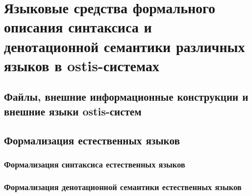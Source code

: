 \chapter{Языковые средства формального описания синтаксиса и денотационной семантики различных языков в ostis-системах}
\label{chapter_lang}


\section{Файлы, внешние информационные конструкции и внешние языки ostis-систем}
\section{Формализация естественных языков}
\subsection{Формализация синтаксиса естественных языков}
\subsection{Формализация денотационной семантики естественных языков}

%
